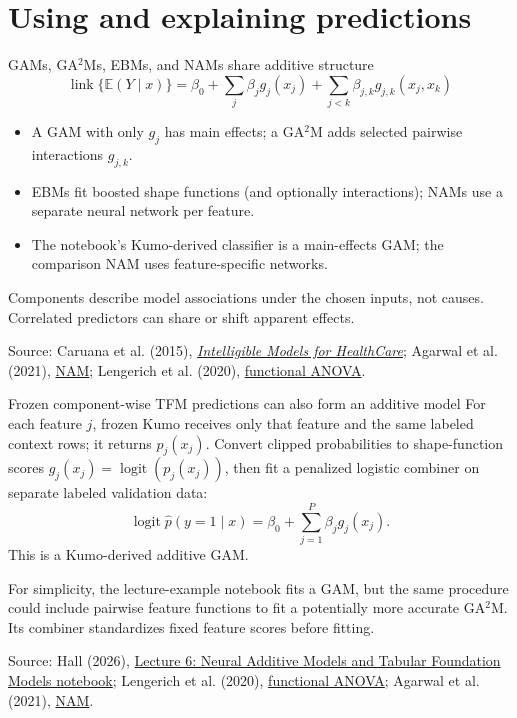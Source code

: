 \documentclass[11pt,aspectratio=169,hyperref={colorlinks}]{beamer}
\newcommand{\slidesource}[1]{\par\vfill\noindent\parbox{\linewidth}{\tiny\color{sourcegray}\raggedright\sloppy Source: #1.}}
\begin{document}
\section{Using and explaining predictions}
\begin{frame}{GAMs, GA$^2$Ms, EBMs, and NAMs share additive structure}
\small
\[
\operatorname{link}\{\mathbb{E}(Y\mid x)\}=\beta_0+\sum_j\beta_j g_j(x_j)+\sum_{j<k}\beta_{j,k}g_{j,k}(x_j,x_k)
\]
\begin{itemize}\itemsep.5em
\item A GAM with only $g_j$ has main effects; a GA$^2$M adds selected pairwise interactions $g_{j,k}$.
\item EBMs fit boosted shape functions (and optionally interactions); NAMs use a separate neural network per feature.
\item The notebook's Kumo-derived classifier is a main-effects GAM; the comparison NAM uses feature-specific networks.
\end{itemize}
Components describe model associations under the chosen inputs, not causes. Correlated predictors can share or shift apparent effects.
\slidesource{Caruana et al. (2015), \href{https://doi.org/10.1145/2783258.2788613}{\emph{Intelligible Models for HealthCare}}; Agarwal et al. (2021), \href{https://proceedings.neurips.cc/paper/2021/hash/251bd0442dfcc53b5a761e050f8022b8-Abstract.html}{NAM}; Lengerich et al. (2020), \href{https://proceedings.mlr.press/v108/lengerich20a.html}{functional ANOVA}}
\end{frame}

\begin{frame}{Frozen component-wise TFM predictions can also form an additive model}
\small
For each feature $j$, frozen Kumo receives only that feature and the same labeled context rows; it returns $p_j(x_j)$. Convert clipped probabilities to shape-function scores $g_j(x_j)=\operatorname{logit}(p_j(x_j))$, then fit a penalized logistic combiner on separate labeled validation data:
\[
\operatorname{logit}\hat p(y=1\mid x)=\beta_0+\sum_{j=1}^{P}\beta_j g_j(x_j).
\]
This is a Kumo-derived additive GAM.

\smallskip
For simplicity, the lecture-example notebook fits a GAM, but the same procedure could include pairwise feature functions to fit a potentially more accurate GA$^2$M. Its combiner standardizes fixed feature scores before fitting.
\slidesource{Hall (2026), \href{https://github.com/jphall663/GWU_LLM/blob/main/misc/existing_materials/lecture_6.ipynb}{Lecture 6: Neural Additive Models and Tabular Foundation Models notebook}; Lengerich et al. (2020), \href{https://proceedings.mlr.press/v108/lengerich20a.html}{functional ANOVA}; Agarwal et al. (2021), \href{https://proceedings.neurips.cc/paper/2021/hash/251bd0442dfcc53b5a761e050f8022b8-Abstract.html}{NAM}}
\end{frame}
\end{document}
